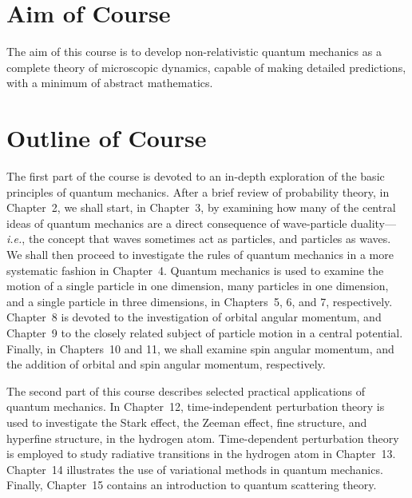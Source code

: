 \section{Aim of Course}
The aim of this course is to develop non-relativistic quantum mechanics
as a complete theory of microscopic dynamics, capable of making detailed
predictions, with a minimum of abstract mathematics.

\section{Outline of Course}
The first part of the course is devoted to an in-depth exploration of the basic
principles of quantum mechanics.  
After
a brief review of probability theory, in Chapter~2, we shall start, in Chapter~3,  by examining how many of the central
ideas of quantum mechanics are a direct consequence of wave-particle
duality---{\em i.e.}, the concept that waves sometimes act as particles, and particles
as waves. We shall then proceed to investigate the rules of quantum mechanics in a more systematic fashion in Chapter~4. Quantum mechanics is used to examine the motion of a single
particle in one dimension, many particles in one dimension, and a single
particle in three dimensions, in Chapters~5, 6,  and 7,
respectively. Chapter~8 is devoted to the investigation of orbital
angular momentum, and Chapter~9 to the closely related subject of
particle motion in a central potential. Finally, in Chapters~10 and 11,
we shall examine spin angular momentum, and the addition of orbital and spin
angular momentum, respectively.

The second part of this course describes
selected practical applications of quantum mechanics. In Chapter~12, time-independent perturbation theory is used to investigate the Stark effect,
the Zeeman effect, fine structure, and hyperfine structure, in the hydrogen
atom. Time-dependent perturbation theory is employed to study
radiative transitions in the hydrogen atom in Chapter~13. Chapter~14
illustrates the use of variational methods in quantum mechanics.
Finally, Chapter~15 contains an introduction to quantum scattering theory.
